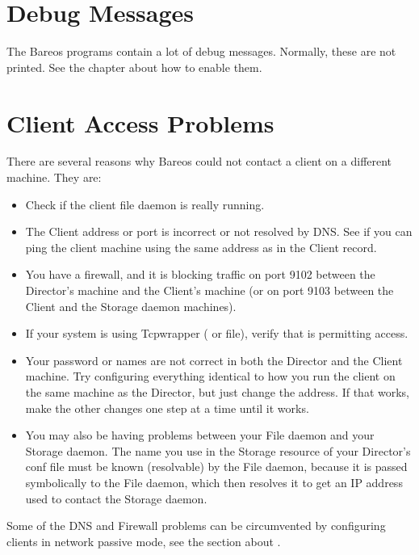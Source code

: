 
\section{Debug Messages}
\label{sec:debug-messages}

The Bareos programs contain a lot of debug messages. Normally, these are not printed.
See the  chapter about how to enable them.


\section{Client Access Problems}
\label{AccessProblems}
   There are several reasons why Bareos could not contact a client  on a
   different machine. They are:

\begin{itemize}
\item Check if the client file daemon is really running.
\item The Client address or port is incorrect or not resolved by  DNS. See if
   you can ping the client machine using the same  address as in the Client
   record.  
\item You have a firewall, and it is blocking traffic on port  9102 between
   the Director's machine and the Client's  machine (or on port 9103 between the
   Client and the Storage daemon  machines). 
\item If your system is using Tcpwrapper ( or  file), verify that is
   permitting access.
\item Your password or names are not correct in both the Director and  the
   Client machine. Try configuring everything identical to  how you run the
   client on the same machine as the Director, but  just change the address. If
   that works, make the other changes  one step at a time until it works.  
\item You may also be having problems between your File daemon and your
   Storage daemon. The name you use in the Storage resource of your
   Director's conf file must be known (resolvable) by the File daemon, 
   because it is passed symbolically to the File daemon, which then
   resolves it to get an IP address used to contact the Storage daemon.
\end{itemize}

Some of the DNS and Firewall problems can be circumvented by configuring clients in network passive mode, see the section about .

